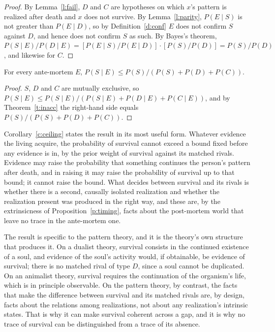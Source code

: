 \documentclass{situationist-preprint}
\begin{document}
\begin{proof}
By Lemma~\ref{l:fail}, $D$ and $C$ are hypotheses on which $x$'s pattern is realized after death and $x$ does not survive. By Lemma~\ref{l:parity}, $P(E \mid S)$ is not greater than $P(E \mid D)$, so by Definition~\ref{d:conf} $E$ does not confirm $S$ against $D$, and hence does not confirm $S$ as such. By Bayes's theorem, $P(S \mid E)/P(D \mid E) = [P(E \mid S)/P(E \mid D)]\cdot[P(S)/P(D)] = P(S)/P(D)$, and likewise for $C$.
\end{proof}

\begin{corollary}[Ceiling]\label{c:ceiling}
For every ante-mortem $E$, $P(S \mid E) \leq P(S)/(P(S) + P(D) + P(C))$.
\end{corollary}

\begin{proof}
$S$, $D$ and $C$ are mutually exclusive, so $P(S \mid E) \leq P(S \mid E)/(P(S\mid E) + P(D \mid E) + P(C \mid E))$, and by Theorem~\ref{t:inacc} the right-hand side equals $P(S)/(P(S) + P(D) + P(C))$.
\end{proof}

Corollary~\ref{c:ceiling} states the result in its most useful form. Whatever evidence the living acquire, the probability of survival cannot exceed a bound fixed before any evidence is in, by the prior weight of survival against its matched rivals. Evidence may raise the probability that something continues the person's pattern after death, and in raising it may raise the probability of survival up to that bound; it cannot raise the bound. What decides between survival and its rivals is whether there is a second, causally isolated realization and whether the realization present was produced in the right way, and these are, by the extrinsicness of Proposition~\ref{p:timing}, facts about the post-mortem world that leave no trace in the ante-mortem one.

The result is specific to the pattern theory, and it is the theory's own structure that produces it. On a dualist theory, survival consists in the continued existence of a soul, and evidence of the soul's activity would, if obtainable, be evidence of survival; there is no matched rival of type $D$, since a soul cannot be duplicated. On an animalist theory, survival requires the continuation of the organism's life, which is in principle observable. On the pattern theory, by contrast, the facts that make the difference between survival and its matched rivals are, by design, facts about the relations among realizations, not about any realization's intrinsic states. That is why it can make survival coherent across a gap, and it is why no trace of survival can be distinguished from a trace of its absence.
\end{document}
